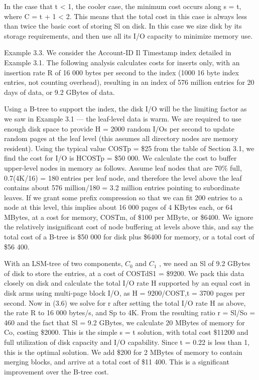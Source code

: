 \documentclass[a4paper,12pt,notitlepage,twoside,openright]{article}
\begin{document}
In the case that t \textless{} 1, the cooler case, the minimum cost
occurs along s = t, where C = t + 1 \textless{} 2. This means that the
total cost in this case is always less than twice the basic cost of
storing Sl on disk. In this case we size disk by its storage
requirements, and then use all its I/O capacity to minimize memory use.

Example 3.3. We consider the Account-ID Il Timestamp index detailed in
Example 3.1. The following analysis calculates costs for inserts only,
with an insertion rate R of 16 000 bytes per second to the index (1000
16 byte index entries, not counting overhead), resulting in an index of
576 million entries for 20 days of data, or 9.2 GBytes of data.

Using a B-tree to support the index, the disk I/O will be the limiting
factor as we saw in Example 3.1 --- the leaf-level data is warm. We are
required to use enough disk space to provide H = 2000 random I/Os per
second to update random pages at the leaf level (this assumes all
directory nodes are memory resident). Using the typical value COSTp =
\$25 from the table of Section 3.1, we find the cost for I/O is HCOSTp =
\$50 000. We calculate the cost to buffer upper-level nodes in memory as
follows. Assume leaf nodes that are 70\% full, 0.7(4K/16) = 180 entries
per leaf node, and therefore the level above the leaf contains about 576
million/180 = 3.2 million entries pointing to subordinate leaves. If we
grant some prefix compression so that we can fit 200 entries to a node
at this level, this implies about 16 000 pages of 4 KBytes each, or 64
MBytes, at a cost for memory, COSTm, of \$100 per MByte, or \$6400. We
ignore the relatively insignificant cost of node buffering at levels
above this, and say the total cost of a B-tree is \$50 000 for disk plus
\$6400 for memory, or a total cost of \$56 400.

With an LSM-tree of two components, \(C_0\) and \(C_1\) , we need an Sl of 9.2
GBytes of disk to store the entries, at a cost of COSTdS1 = \$9200. We
pack this data closely on disk and calculate the total I/O rate H
supported by an equal cost in disk arms using multi-page block I/O, as H
= 9200/COST,t = 3700 pages per second. Now in (3.6) we solve for r after
setting the total I/O rate H as above, the rate R to 16 000 bytes/s, and
Sp to 4K. From the resulting ratio r = Sl/So = 460 and the fact that Sl
= 9.2 GBytes, we calculate 20 MBytes of memory for Co, costing \$2000.
This is the simple s = t solution, with total cost \$11200 and full
utilization of disk capacity and I/O capability. Since t = 0.22 is less
than 1, this is the optimal solution. We add \$200 for 2 MBytes of
memory to contain merging blocks, and arrive at a total cost of \$11
400. This is a significant improvement over the B-tree cost.
\end{document}
